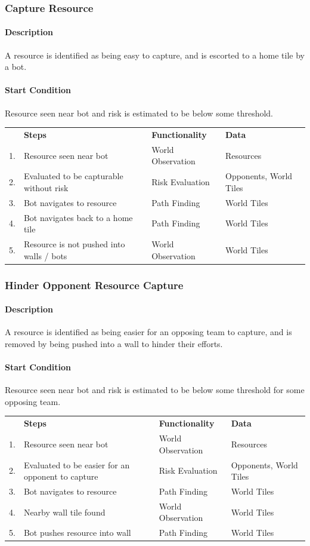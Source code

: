 \documentclass[a4paper,10pt]{article}
\begin{document}
\newcommand{\scenario}[4]{
  \subsubsection{#1}
  \paragraph{Description}
  #2

  \vspace{-3mm}
  \paragraph{Start Condition}
  #3

  \vspace{2mm}
  \begin{center}
  \begin{tabular}{r l l l}
    ~ & \textbf{Steps} & \textbf{Functionality} & \textbf{Data} \\
    #4
  \end{tabular}
  \end{center}
}

\scenario{Capture Resource}{
  A resource is identified as being easy to capture, and is escorted to a home tile by a bot.
}{
  Resource seen near bot and risk is estimated to be below some threshold.
}{
  1. & Resource seen near bot & World Observation & Resources \\
  2. & Evaluated to be capturable without risk & Risk Evaluation & Opponents, World Tiles \\
  3. & Bot navigates to resource & Path Finding & World Tiles \\
  4. & Bot navigates back to a home tile & Path Finding & World Tiles \\
  5. & Resource is not pushed into walls / bots & World Observation & World Tiles \\
}

\scenario{Hinder Opponent Resource Capture}{
  A resource is identified as being easier for an opposing team to capture, and is removed by being pushed into a wall to hinder their efforts.
}{
  Resource seen near bot and risk is estimated to be below some threshold for some opposing team.
}{
  1. & Resource seen near bot & World Observation & Resources \\
  2. & Evaluated to be easier for an opponent to capture & Risk Evaluation & Opponents, World Tiles \\
  3. & Bot navigates to resource & Path Finding & World Tiles \\
  4. & Nearby wall tile found & World Observation & World Tiles \\
  5. & Bot pushes resource into wall & Path Finding & World Tiles \\
}
\end{document}
